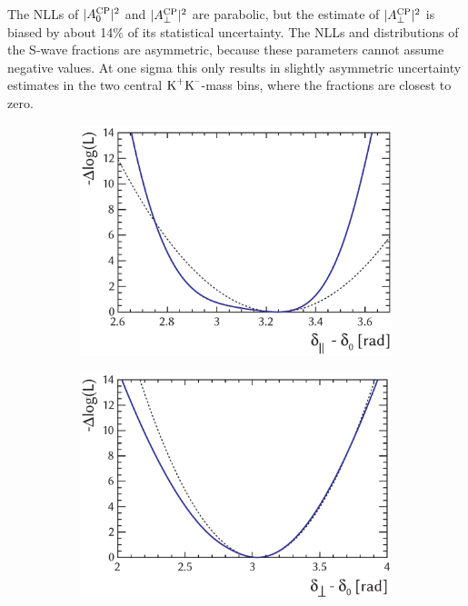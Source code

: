 The NLLs of $|A_0^{\text{CP}}|^2$ and $|A_\perp^{\text{CP}}|^2$ are parabolic, but the estimate of $|A_\perp^{\text{CP}}|^2$ is biased by about 14\% of its statistical
uncertainty. The NLLs and distributions of the S-wave fractions are asymmetric, because these parameters cannot assume negative values. At
one sigma this only results in slightly asymmetric uncertainty estimates in the two central $\text{K}^\text{+}\text{K}^\text{--}$-mass bins, where the
fractions are closest to zero.

\begin{figure}[tbp]
  \centering
  \begin{subfigure}{0.49\textwidth}
    \includegraphics[width=\textwidth]{graphics/results/NLL_polarDep_AparPhase}
    \caption{}
  \end{subfigure}
  \hfill%
  \begin{subfigure}{0.49\textwidth}
    \includegraphics[width=\textwidth]{graphics/results/NLL_polarDep_AperpPhase}
    \caption{}
  \end{subfigure}


\end{figure}
